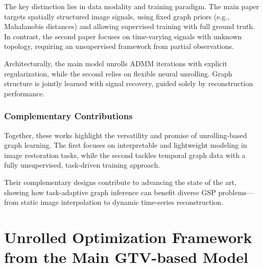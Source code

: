 \documentclass{article}
\theoremstyle{plain}
\theoremstyle{definition}
\theoremstyle{remark}
\begin{document}
The key distinction lies in data modality and training paradigm. The main paper targets spatially structured image signals, using fixed graph priors (e.g., Mahalanobis distances) and allowing supervised training with full ground truth. In contrast, the second paper focuses on time-varying signals with unknown topology, requiring an unsupervised framework from partial observations.

Architecturally, the main model unrolls ADMM iterations with explicit regularization, while the second relies on flexible neural unrolling. Graph structure is jointly learned with signal recovery, guided solely by reconstruction performance.

\subsubsection{Complementary Contributions}

Together, these works highlight the versatility and promise of unrolling-based graph learning. The first focuses on interpretable and lightweight modeling in image restoration tasks, while the second tackles temporal graph data with a fully unsupervised, task-driven training approach. 

Their complementary designs contribute to advancing the state of the art, showing how task-adaptive graph inference can benefit diverse GSP problems—from static image interpolation to dynamic time-series reconstruction.


\newpage




\newpage
\appendix
\onecolumn
\section{Unrolled Optimization Framework from the Main GTV-based Model}
\end{document}
